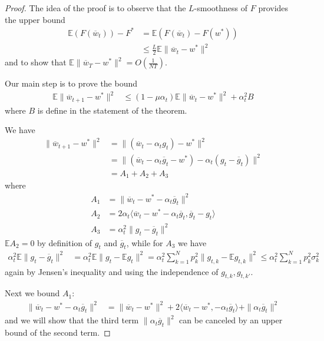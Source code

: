 \begin{proof}
The idea of the proof is to observe that the $L$-smoothness of $F$
provides the upper bound
\begin{align*}
\mathbb{E}(F(\overline{w}_{t}))-F^{\ast} & =\mathbb{E}(F(\overline{w}_{t})-F(w^{\ast}))\\
 & \leq\frac{L}{2}\mathbb{E}\|\overline{w}_{t}-w^{\ast}\|^{2}
\end{align*}
 and to show that $\mathbb{E}\|\overline{w}_{T}-w^{\ast}\|^{2}=O(\frac{1}{NT})$. 

Our main step is to prove the bound 
\begin{align*}
\mathbb{E}\|\overline{w}_{t+1}-w^{\ast}\|^{2} & \leq(1-\mu\alpha_{t})\mathbb{E}\|\overline{w}_{t}-w^{\ast}\|^{2}+\alpha_{t}^{2}B
\end{align*}
 where $B$ is define in the statement of the theorem. 

We have 
\begin{align*}
\|\overline{w}_{t+1}-w^{\ast}\|^{2} & =\|(\overline{w}_{t}-\alpha_{t}g_{t})-w^{\ast}\|^{2}\\
 & =\|(\overline{w}_{t}-\alpha_{t}\overline{g}_{t}-w^{\ast})-\alpha_{t}(g_{t}-\overline{g}_{t})\|^{2}\\
 & =A_{1}+A_{2}+A_{3}
\end{align*}
where 
\begin{align*}
A_{1} & =\|\overline{w}_{t}-w^{\ast}-\alpha_{t}\overline{g}_{t}\|^{2}\\
A_{2} & =2\alpha_{t}\langle\overline{w}_{t}-w^{\ast}-\alpha_{t}\overline{g}_{t},\overline{g}_{t}-g_{t}\rangle\\
A_{3} & =\alpha_{t}^{2}\|g_{t}-\overline{g}_{t}\|^{2}
\end{align*}
 $\mathbb{E}A_{2}=0$ by definition of $g_{t}$ and $\overline{g}_{t}$,
while for $A_{3}$ we have
\begin{align*}
\alpha_{t}^{2}\mathbb{E}\|g_{t}-\overline{g}_{t}\|^{2} & =\alpha_{t}^{2}\mathbb{E}\|g_{t}-\mathbb{E}g_{t}\|^{2}=\alpha_{t}^{2}\sum_{k=1}^{N}p_{k}^{2}\|g_{t,k}-\mathbb{E}g_{t,k}\|^{2}\leq\alpha_{t}^{2}\sum_{k=1}^{N}p_{k}^{2}\sigma_{k}^{2}
\end{align*}
 again by Jensen's inequality and using the independence of $g_{t,k},g_{t,k'}$. 

Next we bound $A_{1}$: 
\begin{align*}
\|\overline{w}_{t}-w^{\ast}-\alpha_{t}\overline{g}_{t}\|^{2} & =\|\overline{w}_{t}-w^{\ast}\|^{2}+2\langle\overline{w}_{t}-w^{\ast},-\alpha_{t}\overline{g}_{t}\rangle+\|\alpha_{t}\overline{g}_{t}\|^{2}
\end{align*}
and we will show that the third term $\|\alpha_{t}\overline{g}_{t}\|^{2}$
can be canceled by an upper bound of the second term. %



\end{proof}
